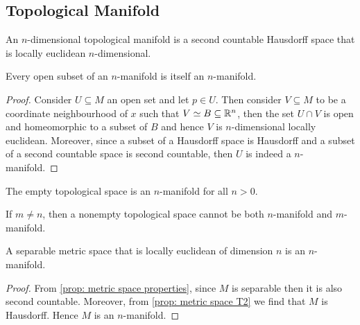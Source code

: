 \subsection{Topological Manifold}

\begin{definition}\label{def: topological manifold}
  An \(n\)-dimensional topological manifold is a second countable Hausdorff
  space that is locally euclidean \(n\)-dimensional.
\end{definition}

\begin{proposition}
  Every open subset of an \(n\)-manifold is itself an \(n\)-manifold.
\end{proposition}

\begin{proof}
  Consider \(U \subseteq M\) an open set and let \(p \in U\). Then consider \(V
  \subseteq M\) to be a coordinate neighbourhood of \(x\) such that \(V \simeq B
  \subseteq \mathbb{R}^n\), then the set \(U \cap V\) is open and homeomorphic
  to a subset of \(B\) and hence \(V\) is \(n\)-dimensional locally euclidean.
  Moreover, since a subset of a Hausdorff space is Hausdorff and a subset of a
  second countable space is second countable, then \(U\) is indeed a
  \(n\)-manifold.
\end{proof}

\begin{definition}
  The empty topological space is an \(n\)-manifold for all \(n > 0\).
\end{definition}

\begin{theorem}\label{def: manifold dimension invariance}
  If \(m \neq n\), then a nonempty topological space cannot be both
  \(n\)-manifold and \(m\)-manifold.
\end{theorem}

\begin{proposition}
  A separable metric space that is locally euclidean of dimension \(n\) is an
  \(n\)-manifold.
\end{proposition}

\begin{proof}
  From \cref{prop: metric space properties}, since \(M\) is separable then it is
  also second countable. Moreover, from \cref{prop: metric space T2} we find
  that \(M\) is Hausdorff. Hence \(M\) is an \(n\)-manifold. 
\end{proof}

